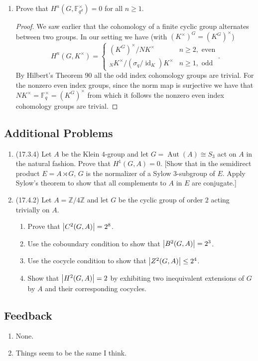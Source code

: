 \documentclass[11pt]{article}
\DeclareMathOperator\Aut{Aut}
\DeclareMathOperator{\id}{id}
\begin{document}
\begin{enumerate}
\begin{enumerate}
\begin{proof}
        Then by interpreting ${}_NK^\times$ as the kernel of the norm map of the cyclic groups $K^\times\to F^\times$ we have that the image of the norm map is a (cyclic) subgroup of order $q-1$ in $\mathbb{F}_q$. But $\mathbb{F}_q$ has order $q-1$ so the image of the norm map on all of $\mathbb{F}_{q^d}$ is exactly $\mathbb{F}_q$.
        \end{proof}
        \item Prove that $H^n(G,\mathbb{F}_{q^d}^\times) = 0$ for all $n\geq 1$. \begin{proof}
            We saw earlier that the cohomology of a finite cyclic group alternates between two groups. In our setting we have (with $(K^\times)^G = (K^G)^\times$) \[H^n(G,K^\times) = \begin{cases}
            (K^G)^\times/NK^\times & n\geq 2, \text{ even} \\
            {}_NK^\times/(\sigma_q/\id_K)K^\times & n\geq 1,\text{ odd}\end{cases}.\] By Hilbert's Theorem 90 all the odd index cohomology groups are trivial. For the nonzero even index groups, since the norm map is surjective we have that $NK^\times = \mathbb{F}_q^\times = (K^G)^\times$ from which it follows the nonzero even index cohomology groups are trivial.
        \end{proof}
    \end{enumerate}
\end{enumerate}
\subsection*{Additional Problems}
\begin{enumerate}
    \item (17.3.4) Let $A$ be the Klein $4$-group and let $G = \Aut(A)\cong S_3$ act on $A$ in the natural fashion. Prove that $H^1(G,A) = 0$. [Show that in the semidirect product $E = A\rtimes G$, $G$ is the normalizer of a Sylow $3$-subgroup of $E$. Apply Sylow's theorem to show that all complements to $A$ in $E$ are conjugate.]
    \item (17.4.2) Let $A=\mathbb{Z}/4\mathbb{Z}$ and let $G$ be the cyclic group of order $2$ acting trivially on $A$.\begin{enumerate}
        \item Prove that $\abs{C^2(G,A)} = 2^8$.
        \item Use the coboundary condition to show that $\abs{B^2(G,A)} = 2^3$.
        \item Use the cocycle condition to show that $\abs{Z^2(G,A)} \leq 2^4$. 
        \item Show that $\abs{H^2(G,A)} = 2$ by exhibiting two inequivalent extensions of $G$ by $A$ and their corresponding cocycles.
    \end{enumerate}
\end{enumerate}
\subsection*{Feedback}
\begin{enumerate}
    \item None.
    \item Things seem to be the same I think.
\end{enumerate}
\end{document}
